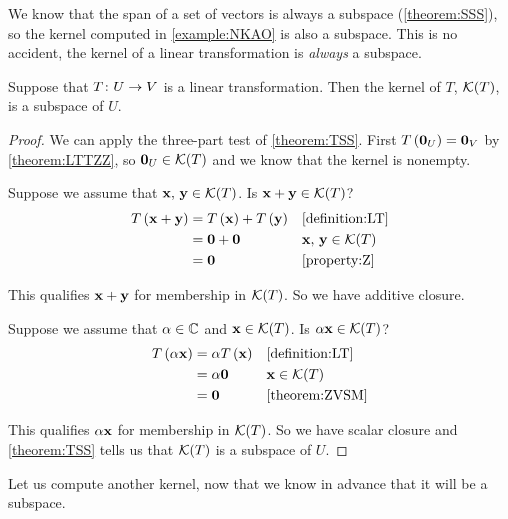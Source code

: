 \documentclass{ximera}
\begin{document}
We know that the span of a set of vectors is always a subspace (\ref{theorem:SSS}), so the kernel computed in \ref{example:NKAO} is also a subspace.  This is no accident, the kernel of a linear transformation is \textit{always} a subspace.

\begin{theorem}
\label{theorem:KLTS}

Suppose that $T\colon U\rightarrow V$ is a linear transformation.  Then the kernel of $T$, $\mathcal{K}\!\left(T\right)$, is a subspace of $U$.


\begin{proof}
We can apply the three-part test of \ref{theorem:TSS}.  First $T\left(\mathbf{0}_U\right)=\mathbf{0}_V$ by \ref{theorem:LTTZZ}, so $\mathbf{0}_U\in\mathcal{K}\!\left(T\right)$ and we know that the kernel is nonempty.



Suppose we assume that $\mathbf{x},\,\mathbf{y}\in\mathcal{K}\!\left(T\right)$.  Is $\mathbf{x}+\mathbf{y}\in\mathcal{K}\!\left(T\right)$?
\begin{align*}
T\left(\mathbf{x}+\mathbf{y}\right)&=T\left(\mathbf{x}\right)+T\left(\mathbf{y}\right)&&\ref{definition:LT}\\
&=\mathbf{0}+\mathbf{0}&&\mathbf{x},\,\mathbf{y}\in\mathcal{K}\!\left(T\right)\\
&=\mathbf{0}&&\ref{property:Z}
\end{align*}



This qualifies $\mathbf{x}+\mathbf{y}$ for membership in $\mathcal{K}\!\left(T\right)$.  So we have additive closure.



Suppose we assume that $\alpha\in\mathbb{C}$ and $\mathbf{x}\in\mathcal{K}\!\left(T\right)$.  Is $\alpha\mathbf{x}\in\mathcal{K}\!\left(T\right)$?
\begin{align*}
T\left(\alpha\mathbf{x}\right)&=\alpha T\left(\mathbf{x}\right)&&\ref{definition:LT}\\
&=\alpha\mathbf{0}&&\mathbf{x}\in\mathcal{K}\!\left(T\right)\\
&=\mathbf{0}&&\ref{theorem:ZVSM}
\end{align*}




This qualifies $\alpha\mathbf{x}$ for membership in $\mathcal{K}\!\left(T\right)$.  So we have scalar closure and \ref{theorem:TSS} tells us that $\mathcal{K}\!\left(T\right)$ is a subspace of $U$.



\end{proof}
\end{theorem}

Let us compute another kernel, now that we know in advance that it will be a subspace.
\end{document}
